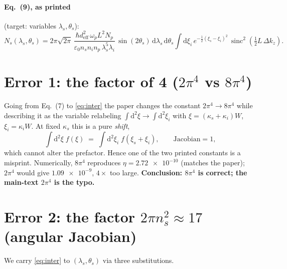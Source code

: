 \documentclass[11pt]{article}
\newcommand{\sinc}{\operatorname{sinc}}
\newcommand{\dd}{\mathrm{d}}
\begin{document}
\paragraph{Eq.~(9), as printed} (target: variables $\lambda_s,\theta_s$):
\begin{equation}
N_s(\lambda_s,\theta_s) =
2\pi\sqrt{2\pi}\,
\frac{\hbar d_{\mathrm{eff}}^2\,\omega_p L^2 N_p}
{\varepsilon_0 n_s n_i n_p\,\lambda_s^5\lambda_i}\,
\sin(2\theta_s)\,\dd\lambda_s\,\dd\theta_s
\int \dd\xi_i\, e^{-\frac12(\xi_s-\xi_i)^2}\,
\sinc^2\!\left(\tfrac12 L\,\Delta k_z\right).
\tag{9}
\end{equation}

\section*{Error 1: the factor of 4 ($2\pi^4$ vs $8\pi^4$)}

Going from Eq.~(7) to \eqref{eq:inter} the paper changes the constant
$2\pi^4 \to 8\pi^4$ while describing it as the variable relabeling
$\int\dd^2\xi \to \int\dd^2\xi_i$ with $\xi=(\kappa_s+\kappa_i)W$,
$\xi_i=\kappa_i W$. At fixed $\kappa_s$ this is a pure \emph{shift},
\begin{equation}
\int \dd^2\xi\; f(\xi) \;=\; \int \dd^2\xi_i\; f(\xi_s+\xi_i),
\qquad \text{Jacobian}=1,
\end{equation}
which cannot alter the prefactor. Hence one of the two printed constants is a
misprint. Numerically, $8\pi^4$ reproduces $\eta=\num{2.72e-10}$ (matches the
paper); $2\pi^4$ would give $\num{1.09e-9}$, $4\times$ too large.
\textbf{Conclusion: $8\pi^4$ is correct; the main-text $2\pi^4$ is the typo.}

\section*{Error 2: the factor $2\pi n_s^2\approx 17$ (angular Jacobian)}

We carry \eqref{eq:inter} to $(\lambda_s,\theta_s)$ via three substitutions.
\end{document}
